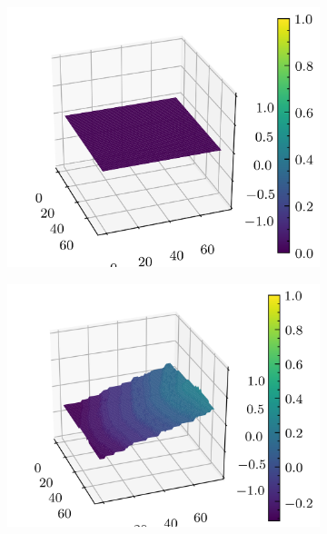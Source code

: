\documentclass[../document.tex]{subfiles}
\begin{document}
\begin{figure}[H]
\begin{subfigure}[b]{0.19\textwidth}
        \includegraphics[width=\linewidth]{../img/5/quarry/best/patch-3d-2.png}
    \end{subfigure}
    \begin{subfigure}[b]{0.19\textwidth}
        \includegraphics[width=\linewidth]{../img/5/quarry/best/patch-3d-3.png}
    \end{subfigure}  
    \begin{subfigure}[b]{0.19\textwidth}

\end{subfigure}
\end{figure}
\end{document}
